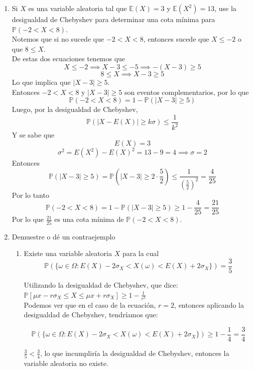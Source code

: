 \documentclass[12pt,a4paper]{report}
\begin{document}
\begin{enumerate}
		\item{
			Si $X$ es una variable aleatoria tal que $\mathbb{E}(X) = 3$ y
			$\mathbb{E}(X^2) = 13$, use la desigualdad de Chebyshev para
			determinar una cota mínima para $\mathbb{P}(-2 < X < 8)$.\\
			Notemos que si no sucede que $-2 < X < 8$, entonces  sucede que
					$X \leq -2$ o que $8 \leq X$.\\
					De estas dos ecuaciones tenemos que
					\[X \leq -2 \implies X - 3 \leq -5 \implies -(X - 3) \geq 5\]
					\[ 8 \leq X \implies X - 3 \geq 5\]
					Lo que implica que $|X-3| \geq 5$.\\
					Entonces $-2 < X < 8$ y $|X-3| \geq 5$ son eventos
					complementarios, por lo que
					\[\mathbb{P}(-2 < X < 8) = 1 - \mathbb{P}(|X-3| \geq 5)\]
					Luego, por la desigualdad de Chebyshev,
					\[\mathbb{P}(|X-E(X)| \geq k\sigma) \leq \frac{1}{k^2}\]
					Y se sabe que
					\[E(X) = 3\]
					\[\sigma ^2 = E(X^2) - E(X)^2 = 13 - 9 = 4 \implies \sigma = 2\]
					Entonces
					\[\mathbb{P}(|X-3| \geq 5) = \mathbb{P}(|X-3| \geq 2\cdot \frac{5}{2})
					 \leq \frac{1}{(\frac{5}{2})^2} = \frac{4}{25}\]
					Por lo tanto
					\[\mathbb{P}(-2 < X < 8) = 1 - \mathbb{P}(|X-3| \geq 5)
					\geq 1 - \frac{4}{25} = \frac{21}{25}\]
					Por lo que $\frac{21}{25}$ es una cota mínima de
					$\mathbb{P}(-2 < X < 8)$.
		}

		\item{
			Demuestre o dé un contraejemplo
			\begin{enumerate}
				\item {
					Existe una variable aleatoria $X$ para la cual
					\[\mathbb{P}(\{\omega \in \Omega : E(X) - 2\sigma_X <
					X(\omega) <
					E(X) + 2\sigma_X\}) = \frac{3}{5}\]


					Utilizando la desigualdad de Chebyshev, que dice:\\
					$\mathbb{P}[ \mu x - r\sigma_X \leq X \leq \mu x + r\sigma_X] \geq 1 - \frac{1}{r^2}$\\

				Podemos ver que en el caso de la ecuación, $r = 2$, entonces aplicando la desigualdad de Chebyshev, tendríamos que:

				\[\mathbb{P}(\{\omega \in \Omega : E(X) - 2\sigma_X <
					X(\omega) <
					E(X) + 2\sigma_X\}) \geq 1 - \frac{1}{4} = \frac{3}{4}\]

					$\frac{3}{5} < \frac{3}{4}$, lo que incumpliría la desigualdad de Chebyshev, entonces la variable aleatoria no existe.\\


}
\end{enumerate}}
\end{enumerate}
\end{document}
